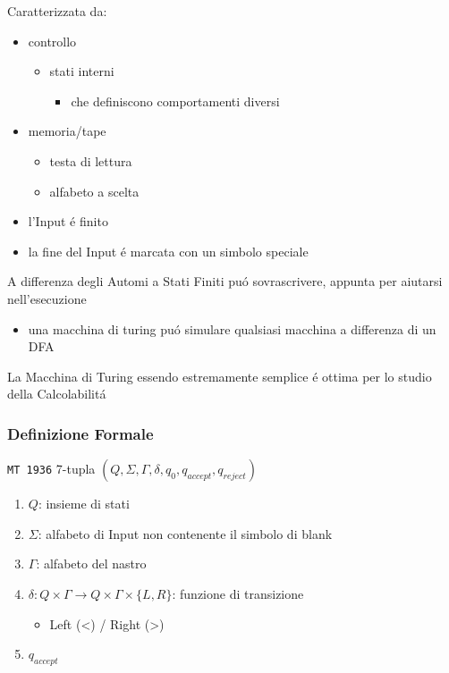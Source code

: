 \documentclass[
                        12pt, %
                        a4paper, %
                        oneside, %
                        headinclude,footinclude, %
                        BCOR5mm, %
                  ]{scrartcl}
\begin{document}
Caratterizzata da:
\begin{itemize}
\item controllo
\begin{itemize}
\item stati interni
\begin{itemize}
\item che definiscono comportamenti diversi
\end{itemize}
\end{itemize}
\item memoria/tape
\begin{itemize}
\item testa di lettura
\item alfabeto a scelta
\end{itemize}

\item l'Input é finito
\item la fine del Input é marcata con un simbolo speciale
\end{itemize}

A differenza degli Automi a Stati Finiti puó sovrascrivere, appunta per aiutarsi nell'esecuzione
\begin{itemize}
\item una macchina di turing puó simulare qualsiasi macchina a differenza di un DFA
\end{itemize}
La Macchina di Turing essendo estremamente semplice é ottima per lo studio della Calcolabilitá

\subsubsection{Definizione Formale}
\label{sec:orgf7352c4}
\texttt{MT 1936}
7-tupla \((Q,\Sigma,\Gamma,\delta,q_0,q_{accept},q_{reject})\)
\begin{enumerate}
\item \(Q\): insieme di stati
\item \(\Sigma\): alfabeto di Input non contenente il simbolo di blank
\item \(\Gamma\): alfabeto del nastro
\item \(\delta: Q \times \Gamma \rightarrow Q \times \Gamma \times \{L,R\}\): funzione di transizione
\begin{itemize}
\item Left (<) / Right (>)
\end{itemize}
\item \(q_{accept}\)
\end{enumerate}
\end{document}
